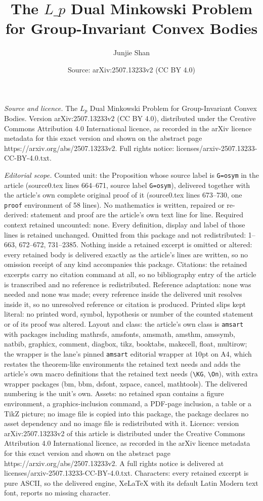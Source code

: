 \documentclass[10pt,a4paper]{amsart}
\title[The $L\_{p}$ Dual Minkowski Problem for Group-Invariant Conve]{The $L\_{p}$ Dual Minkowski Problem for Group-Invariant Convex Bodies}
\author{Junjie Shan}
\date{Source: arXiv:2507.13233v2 (CC BY 4.0)}
\begin{document}
\maketitle

\noindent\emph{Source and licence.} The $L_{p}$ Dual Minkowski Problem for Group-Invariant Convex Bodies. Version arXiv:2507.13233v2 (CC BY 4.0), distributed under the Creative Commons Attribution 4.0 International licence, as recorded in the arXiv licence metadata for this exact version and shown on the abstract page https://arxiv.org/abs/2507.13233v2. Full rights notice: licenses/arxiv-2507.13233-CC-BY-4.0.txt.\par\smallskip

\noindent\textit{Editorial scope.} Counted unit: the Proposition whose source label is \texttt{G=osym} in the article (source0.tex lines 664--671, source label \texttt{G=osym}), delivered together with the article's own complete original proof of it (source0.tex lines 673--730, one \texttt{proof} environment of 58 lines). No mathematics is written, repaired or re-derived: statement and proof are the article's own text line for line. Required context retained uncounted: none. Every definition, display and label of those lines is retained unchanged. Omitted from this package and not redistributed: 1--663, 672--672, 731--2385. Nothing inside a retained excerpt is omitted or altered: every retained body is delivered exactly as the article's lines are written, so no omission receipt of any kind accompanies this package. Citations: the retained excerpts carry no citation command at all, so no bibliography entry of the article is transcribed and no reference is redistributed. Reference adaptation: none was needed and none was made; every reference inside the delivered unit resolves inside it, so no unresolved reference or citation is produced. Printed slips kept literal: no printed word, symbol, hypothesis or number of the counted statement or of its proof was altered. Layout and class: the article's own class is \texttt{amsart} with packages including mathrsfs, amsfonts, amsmath, amsthm, amssymb, natbib, graphicx, comment, diagbox, tikz, booktabs, makecell, float, multirow; the wrapper is the lane's pinned \texttt{amsart} editorial wrapper at 10pt on A4, which restates the theorem-like environments the retained text needs and adds the article's own macro definitions that the retained text needs (\texttt{\textbackslash KG}, \texttt{\textbackslash On}), with extra wrapper packages (bm, bbm, dsfont, xspace, cancel, mathtools). The delivered numbering is the unit's own. Assets: no retained span contains a figure environment, a graphics-inclusion command, a PDF-page inclusion, a table or a TikZ picture; no image file is copied into this package, the package declares no asset dependency and no image file is redistributed with it. Licence: version arXiv:2507.13233v2 of this article is distributed under the Creative Commons Attribution 4.0 International licence, as recorded in the arXiv licence metadata for this exact version and shown on the abstract page https://arxiv.org/abs/2507.13233v2. A full rights notice is delivered at licenses/arxiv-2507.13233-CC-BY-4.0.txt. Characters: every retained excerpt is pure ASCII, so the delivered engine, XeLaTeX with its default Latin Modern text font, reports no missing character.
\end{document}
